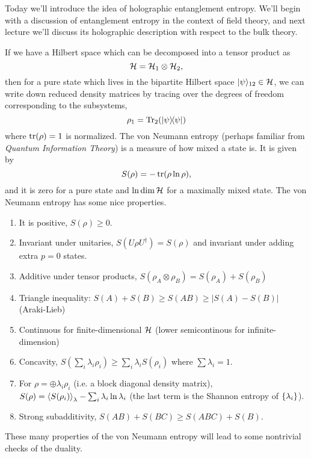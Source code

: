 Today we'll introduce the idea of holographic entanglement entropy. We'll begin with a discussion of entanglement entropy in the context of field theory, and next lecture we'll discuss its holographic description with respect to the bulk theory.

If we have a Hilbert space which can be decomposed into a tensor product as
\begin{equation}
    \mathcal H=\mathcal H_1 \otimes \mathcal H_2,
\end{equation}
then for a pure state which lives in the bipartite Hilbert space $\lvert\psi\rangle_{12}\in \mathcal H$, we can write down reduced density matrices by tracing over the degrees of freedom corresponding to the subsystems,
\begin{equation}
    \rho_1 = \operatorname{Tr}_2(\left\lvert{\psi}\middle\rangle\!\middle\langle{\psi}\right\rvert)
\end{equation}
where $\operatorname{tr}(\rho)=1$ is normalized. The von Neumann entropy (perhaps familiar from \emph{Quantum Information Theory}) is a measure of how mixed a state is. It is given by
\begin{equation}
    S(\rho) = -\operatorname{tr}(\rho \ln \rho),
\end{equation}
and it is zero for a pure state and $\ln \dim \mathcal H$ for a maximally mixed state. The von Neumann entropy has some nice properties.
\begin{enumerate}
    \item It is positive, $S(\rho)\geq 0$.
    \item Invariant under unitaries, $S(U\rho U^\dagger)=S(\rho)$ and invariant under adding extra $p=0$ states.
    \item Additive under tensor products, $S(\rho_A \otimes \rho_B) = S(\rho_A) + S(\rho_B)$
    \item Triangle inequality: $S(A)+S(B) \geq S(AB) \geq |S(A)-S(B)|$ (Araki-Lieb)
    \item Continuous for finite-dimensional $\mathcal H$ (lower semicontinous for infinite-dimension)
    \item Concavity, $S(\sum_i \lambda_i \rho_i) \geq \sum_i \lambda_i S(\rho_i)$ where $\sum \lambda_i =1$.
    \item For $\rho=\oplus \lambda_i \rho_i$ (i.e. a block diagonal density matrix), $S(\rho)=\left< S(\rho_i) \right>_\lambda - \sum_i \lambda_i\ln \lambda_i$ (the last term is the Shannon entropy of $\{\lambda_i\}$).
    \item Strong subadditivity, $S(AB) + S(BC) \geq S(ABC)+ S(B)$.
\end{enumerate}
These many properties of the von Neumann entropy will lead to some nontrivial checks of the duality.


